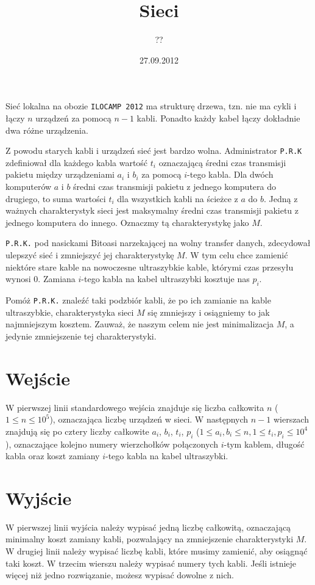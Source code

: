 \documentclass[zad,zawodnik]{sinol}
\title{Sieci}
\author{??}
\date{27.09.2012}
\begin{document}
  \begin{tasktext}%
Sieć lokalna na obozie \texttt{ILOCAMP 2012} ma strukturę drzewa, tzn. nie ma cykli i łączy $n$ urządzeń za pomocą $n-1$ kabli. Ponadto każdy kabel łączy dokładnie dwa różne urządzenia.

Z powodu starych kabli i urządzeń sieć jest bardzo wolna. Administrator \texttt{P.R.K} zdefiniował dla każdego kabla wartość $t_i$ oznaczającą średni czas transmisji pakietu między urządzeniami $a_i$ i $b_i$ za pomocą $i$-tego kabla.
Dla dwóch komputerów $a$ i $b$ średni czas transmisji pakietu z jednego komputera do drugiego, to suma wartości $t_i$ dla wszystkich kabli na ścieżce z $a$ do $b$. Jedną z ważnych charakterystyk sieci jest maksymalny średni czas transmisji pakietu z jednego komputera do innego. Oznaczmy tą charakterystykę jako $M$.

\texttt{P.R.K.} pod nasickami Bitoasi narzekającej na wolny transfer danych, zdecydował ulepszyć sieć i zmniejszyć jej charakterystykę $M$. W tym celu chce zamienić niektóre stare kable na nowoczesne ultraszybkie kable, którymi czas przesyłu wynosi $0$. Zamiana $i$-tego kabla na kabel ultraszybki kosztuje nas $p_i$.

Pomóż \texttt{P.R.K.} znaleźć taki podzbiór kabli, że po ich zamianie na kable ultraszybkie, charakterystyka sieci $M$ się zmniejszy i osiągniemy to jak najmniejszym kosztem. Zauważ, że naszym celem nie jest minimalizacja $M$, a jedynie zmniejszenie tej charakterystyki.


  \section{Wejście}
W pierwszej linii standardowego wejścia znajduje się liczba całkowita $n$ ($1\leq n \leq 10^5$), oznaczająca liczbę urządzeń w sieci. W następnych $n-1$ wierszach znajdują się po cztery liczby całkowite $a_i$, $b_i$, $t_i$, $p_i$ ($1\leq a_i, b_i\leq n, 1\leq t_i, p_i \leq 10^4$), oznaczające kolejno numery wierzchołków połączonych $i$-tym kablem, długość kabla oraz koszt zamiany $i$-tego kabla na kabel ultraszybki.

  \section{Wyjście}
	
W pierwszej linii wyjścia należy wypisać jedną liczbę całkowitą, oznaczającą minimalny koszt zamiany kabli, pozwalający na zmniejszenie charakterystyki $M$. W drugiej linii należy wypisać liczbę kabli, które musimy zamienić, aby osiągnąć taki koszt. W trzecim wierszu należy wypisać numery tych kabli. Jeśli istnieje więcej niż jedno rozwiązanie, możesz wypisać dowolne z nich.

     \makecompactexample

  \end{tasktext}
\end{document}
